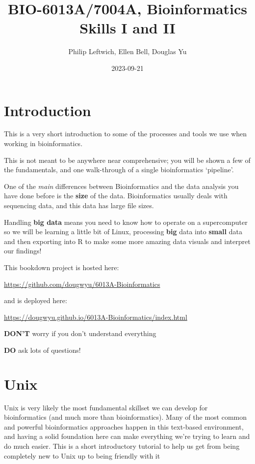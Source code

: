 \documentclass[
]{book}
\title{BIO-6013A/7004A, Bioinformatics Skills I and II}
\author{Philip Leftwich, Ellen Bell, Douglas Yu}
\date{2023-09-21}
\begin{document}
\maketitle

{
\setcounter{tocdepth}{1}
\tableofcontents
}
\hypertarget{introduction}{%
\chapter{Introduction}\label{introduction}}

This is a very short introduction to some of the processes and tools we use when working in bioinformatics.

This is not meant to be anywhere near comprehensive; you will be shown a few of the fundamentals, and one walk-through of a single bioinformatics `pipeline'.

One of the \emph{main} differences between Bioinformatics and the data analysis you have done before is the \textbf{size} of the data. Bioinformatics usually deals with sequencing data, and this data has large file sizes.

Handling \textbf{big data} means you need to know how to operate on a supercomputer so we will be learning a little bit of Linux, processing \textbf{big} data into \textbf{small} data and then exporting into R to make some more amazing data visuals and interpret our findings!

This bookdown project is hosted here:

\url{https://github.com/dougwyu/6013A-Bioinformatics}

and is deployed here:

\url{https://dougwyu.github.io/6013A-Bioinformatics/index.html}

\textbf{DON'T} worry if you don't understand everything

\textbf{DO} ask lots of questions!

\hypertarget{Unix}{%
\chapter{Unix}\label{Unix}}

Unix is very likely the most fundamental skillset we can develop for bioinformatics (and much more than bioinformatics). Many of the most common and powerful bioinformatics approaches happen in this text-based environment, and having a solid foundation here can make everything we're trying to learn and do much easier. This is a short introductory tutorial to help us get from being completely new to Unix up to being friendly with it 🙂
\end{document}
